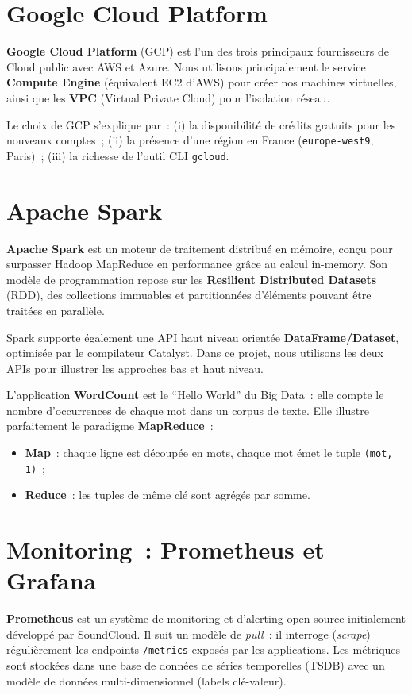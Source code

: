 \documentclass[12pt,a4paper,french]{report}
\newcommand{\cmd}[1]{\texttt{\small\color{keywordcolor}#1}}
\newcommand{\kw}[1]{\textbf{#1}}
\begin{document}
\section{Google Cloud Platform}

\kw{Google Cloud Platform} (GCP) est l'un des trois principaux fournisseurs de Cloud public avec AWS et Azure. Nous utilisons principalement le service \kw{Compute Engine} (équivalent EC2 d'AWS) pour créer nos machines virtuelles, ainsi que les \kw{VPC} (Virtual Private Cloud) pour l'isolation réseau.

Le choix de GCP s'explique par~: (i) la disponibilité de crédits gratuits pour les nouveaux comptes~; (ii) la présence d'une région en France (\texttt{europe-west9}, Paris)~; (iii) la richesse de l'outil CLI \cmd{gcloud}.

\section{Apache Spark}

\kw{Apache Spark} est un moteur de traitement distribué en mémoire, conçu pour surpasser Hadoop MapReduce en performance grâce au calcul in-memory. Son modèle de programmation repose sur les \kw{Resilient Distributed Datasets} (RDD), des collections immuables et partitionnées d'éléments pouvant être traitées en parallèle.

Spark supporte également une API haut niveau orientée \kw{DataFrame/Dataset}, optimisée par le compilateur Catalyst. Dans ce projet, nous utilisons les deux APIs pour illustrer les approches bas et haut niveau.

L'application \kw{WordCount} est le ``Hello World'' du Big Data~: elle compte le nombre d'occurrences de chaque mot dans un corpus de texte. Elle illustre parfaitement le paradigme \kw{MapReduce}~:
\begin{itemize}
  \item \textbf{Map}~: chaque ligne est découpée en mots, chaque mot émet le tuple \texttt{(mot, 1)}~;
  \item \textbf{Reduce}~: les tuples de même clé sont agrégés par somme.
\end{itemize}

\section{Monitoring~: Prometheus et Grafana}

\kw{Prometheus} est un système de monitoring et d'alerting open-source initialement développé par SoundCloud. Il suit un modèle de \emph{pull}~: il interroge (\emph{scrape}) régulièrement les endpoints \texttt{/metrics} exposés par les applications. Les métriques sont stockées dans une base de données de séries temporelles (TSDB) avec un modèle de données multi-dimensionnel (labels clé-valeur).
\end{document}
